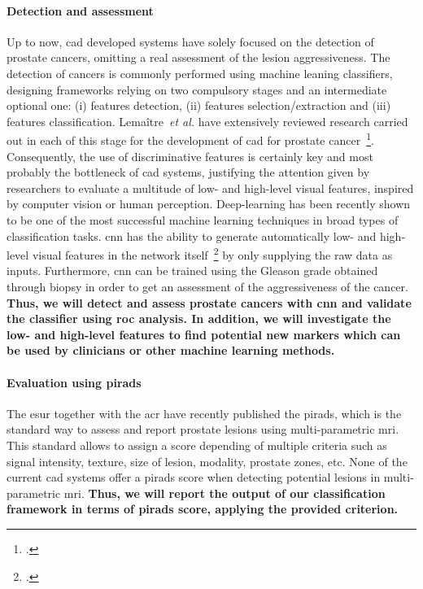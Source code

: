 \paragraph{Detection and assessment}

Up to now, \ac{cad} developed systems have solely focused on the detection of prostate cancers, omitting a real assessment of the lesion aggressiveness.
The detection of cancers is commonly performed using machine leaning classifiers, designing frameworks relying on two compulsory stages and an intermediate optional one: (i) features detection, (ii) features selection/extraction and (iii) features classification.
Lema\^itre~\emph{et al.} have extensively reviewed research carried out in each of this stage for the development of \ac{cad} for prostate cancer~\footcite{Lemaitre2015}.
Consequently, the use of discriminative features is certainly key and most probably the bottleneck of \ac{cad} systems, justifying the attention given by researchers to evaluate a multitude of low- and high-level visual features, inspired by computer vision or human perception.
Deep-learning has been recently shown to be one of the most successful machine learning techniques in broad types of classification tasks.
\ac{cnn} has the ability to generate automatically low- and high-level visual features in the network itself~\footcite{Zeiler2013} by only supplying the raw data as inputs.
Furthermore, \ac{cnn} can be trained using the Gleason grade obtained through biopsy in order to get an assessment of the aggressiveness of the cancer.
\textbf{Thus, we will detect and assess prostate cancers with \ac{cnn} and validate the classifier using \ac{roc} analysis. In addition, we will investigate the low- and high-level features to find potential new markers which can be used by clinicians or other machine learning methods.}

\paragraph{Evaluation using \acs*{pirads}}

The \ac{esur} together with the \ac{acr} have recently published the \ac{pirads}, which is the standard way to assess and report prostate lesions using multi-parametric \ac{mri}.
This standard allows to assign a score depending of multiple criteria such as signal intensity, texture, size of lesion, modality, prostate zones, etc.
None of the current \ac{cad} systems offer a \ac{pirads} score when detecting potential lesions in multi-parametric \ac{mri}.
\textbf{Thus, we will report the output of our classification framework in terms of \ac{pirads} score, applying the provided criterion.}

